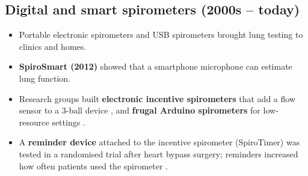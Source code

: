 \documentclass[12pt,a4paper]{article}
\begin{document}
\subsection{Digital and smart spirometers (2000s -- today)}
\begin{itemize}
  \item Portable electronic spirometers and USB spirometers brought lung testing to clinics and homes.
  \item \textbf{SpiroSmart (2012)} showed that a smartphone microphone can estimate lung function.
  \item Research groups built \textbf{electronic incentive spirometers} that add a flow sensor to a 3-ball device \cite{silva}, and \textbf{frugal Arduino spirometers} for low-resource settings \cite{wallace}.
  \item A \textbf{reminder device} attached to the incentive spirometer (SpiroTimer) was tested in a randomised trial after heart bypass surgery; reminders increased how often patients used the spirometer \cite{eltorai2019}.
\end{itemize}
\end{document}
